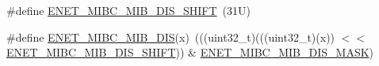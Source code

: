 \begin{DoxyCompactItemize}
\item 
\#define \mbox{\hyperlink{group___e_n_e_t___register___masks_gadb11718d0241c2e441cc2eb36d9d9e6e}{E\+N\+E\+T\+\_\+\+M\+I\+B\+C\+\_\+\+M\+I\+B\+\_\+\+D\+I\+S\+\_\+\+S\+H\+I\+FT}}~(31\+U)
\item 
\#define \mbox{\hyperlink{group___e_n_e_t___register___masks_ga7941ccece2a03bc28c76cee267d83cc0}{E\+N\+E\+T\+\_\+\+M\+I\+B\+C\+\_\+\+M\+I\+B\+\_\+\+D\+IS}}(x)~(((uint32\+\_\+t)(((uint32\+\_\+t)(x)) $<$$<$ \mbox{\hyperlink{group___e_n_e_t___register___masks_gadb11718d0241c2e441cc2eb36d9d9e6e}{E\+N\+E\+T\+\_\+\+M\+I\+B\+C\+\_\+\+M\+I\+B\+\_\+\+D\+I\+S\+\_\+\+S\+H\+I\+FT}})) \& \mbox{\hyperlink{group___e_n_e_t___register___masks_ga0e0763360e871b1a1f7e989f5695ece3}{E\+N\+E\+T\+\_\+\+M\+I\+B\+C\+\_\+\+M\+I\+B\+\_\+\+D\+I\+S\+\_\+\+M\+A\+SK}})
\end{DoxyCompactItemize}
